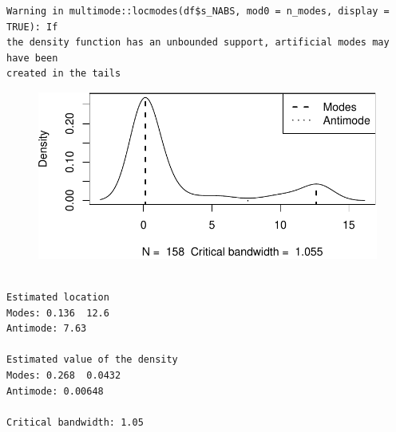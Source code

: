 \documentclass[
  letterpaper,
  DIV=11,
  numbers=noendperiod]{scrreprt}
\newenvironment{Shaded}{\begin{snugshade}}{\end{snugshade}}
\newcommand{\AttributeTok}[1]{\textcolor[rgb]{0.40,0.45,0.13}{#1}}
\newcommand{\ConstantTok}[1]{\textcolor[rgb]{0.56,0.35,0.01}{#1}}
\newcommand{\DecValTok}[1]{\textcolor[rgb]{0.68,0.00,0.00}{#1}}
\newcommand{\FunctionTok}[1]{\textcolor[rgb]{0.28,0.35,0.67}{#1}}
\newcommand{\NormalTok}[1]{\textcolor[rgb]{0.00,0.23,0.31}{#1}}
\newcommand{\OtherTok}[1]{\textcolor[rgb]{0.00,0.23,0.31}{#1}}
\newcommand{\SpecialCharTok}[1]{\textcolor[rgb]{0.37,0.37,0.37}{#1}}
\begin{document}
\begin{Shaded}
\end{Shaded}

\begin{verbatim}
Warning in multimode::locmodes(df$s_NABS, mod0 = n_modes, display = TRUE): If
the density function has an unbounded support, artificial modes may have been
created in the tails
\end{verbatim}

\begin{figure}[H]

{\centering \includegraphics{analysis/SGC3A/5_sgc3A_exploration_files/figure-pdf/MASS-111-1.pdf}

}

\end{figure}

\begin{verbatim}

Estimated location
Modes: 0.136  12.6 
Antimode: 7.63 

Estimated value of the density
Modes: 0.268  0.0432 
Antimode: 0.00648 

Critical bandwidth: 1.05
\end{verbatim}

\begin{Shaded}
\end{Shaded}
\end{document}
